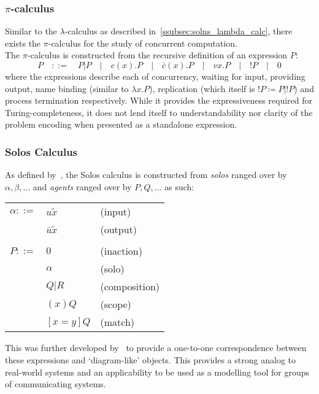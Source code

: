 \documentclass{article}
\begin{document}
\subsubsection{$\pi$-calculus}
Similar to the $\lambda$-calculus as described in~\ref{ssubsec:solns_lambda_calc}, there exists the $\pi$-calculus for the study of concurrent computation.
\\
The $\pi$-calculus is constructed from the recursive definition of  an expression $P$:
\begin{equation*}
	P  \quad::=\quad  P|P  \quad|\quad  c(x).P  \quad|\quad  \bar{c}(x).P  \quad|\quad  vx.P  \quad|\quad  !P  \quad|\quad  0
\end{equation*}
where the expressions describe each of concurrency, waiting for input, providing output, name binding (similar to $\lambda x . P$), replication (which itself is $!P \coloneq P|!P$) and process termination respectively.
While it provides the expressiveness required for Turing-completeness, it does not lend itself to understandability nor clarity of the problem encoding when presented as a standalone expression.

\subsubsection{Solos Calculus}
As defined by~\cite{solo-concert}, the Solos calculus is constructed from \textit{solos} ranged over by $\alpha,\beta,\ldots$ and \textit{agents} ranged over by $P,Q,\ldots$ as such:
\begin{center}
	\begin{tabular}{ l l l }
		$\alpha ::=$	& $u\tilde{x}$		& (input) \\
				& $\bar{u}\tilde{x}$	& (output) \\ \\
		$P ::=$		& $0$			& (inaction) \\
				& $\alpha$		& (solo) \\
				& $Q | R$		& (composition) \\
				& $(x)Q$		& (scope) \\
				& $[x=y]Q$		& (match) \\
	\end{tabular}
\end{center}
This was further developed by~\cite{solo-diagrams} to provide a one-to-one correspondence between these  expressions and `diagram-like' objects. This provides a strong analog to real-world systems and an applicability to be used as a modelling tool for groups of communicating systems.
\end{document}
